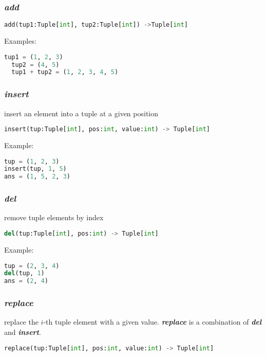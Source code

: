\subsubsection{\textbf{\textit{add}}}
  \begin{lstlisting}[language=Python]
  add(tup1:Tuple[int], tup2:Tuple[int]) ->Tuple[int]
  \end{lstlisting}
  Examples:
  \begin{lstlisting}[language=Python]
  tup1 = (1, 2, 3)
  tup2 = (4, 5)
  tup1 + tup2 = (1, 2, 3, 4, 5)
  \end{lstlisting}

\subsubsection{\textbf{\textit{insert}}}

insert an element into a tuple at a given position

\begin{lstlisting}[language=Python]
insert(tup:Tuple[int], pos:int, value:int) -> Tuple[int]
\end{lstlisting}

Example:
\begin{lstlisting}[language=Python]
tup = (1, 2, 3)
insert(tup, 1, 5)
ans = (1, 5, 2, 3)
\end{lstlisting}

\subsubsection{\textbf{\textit{del}}}

remove tuple elements by index
\begin{lstlisting}[language=Python]
del(tup:Tuple[int], pos:int) -> Tuple[int]
\end{lstlisting}
Example:
\begin{lstlisting}[language=Python]
tup = (2, 3, 4)
del(tup, 1)
ans = (2, 4)
\end{lstlisting}

\subsubsection{\textbf{\textit{replace}}}

replace the $i$-th tuple element with a given value. \textit{\textbf{replace}} is a combination of \textit{\textbf{del}} and \textit{\textbf{insert}}.

\begin{lstlisting}[language=Python]
replace(tup:Tuple[int], pos:int, value:int) -> Tuple[int]
\end{lstlisting}

